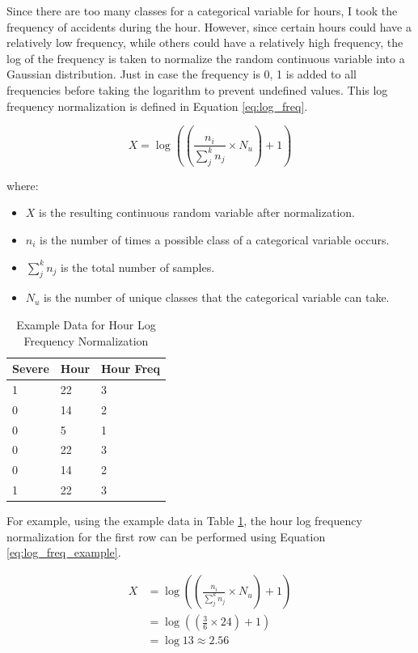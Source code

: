 Since there are too many classes for a categorical variable for hours, I took the frequency of accidents during the hour. However, since certain hours could have a relatively low frequency, while others could have a relatively high frequency, the log of the frequency is taken to normalize the random continuous variable into a Gaussian distribution. Just in case the frequency is 0, 1 is added to all frequencies before taking the logarithm to prevent undefined values. This log frequency normalization \citep{macurdypencavellog} is defined in Equation \ref{eq:log_freq}.

\begin{equation} \label{eq:log_freq}
    X = \log \left(\left({\frac{n_i}{\sum_{j}^{k}n_j}} \times N_u\right) + 1\right)
\end{equation}

\noindent
where:
\begin{itemize}
    \item $X$ is the resulting continuous random variable after normalization.
    \item $n_i$ is the number of times a possible class of a categorical variable occurs.
    \item $\sum_{j}^{k}n_j$ is the total number of samples.
    \item $N_u$ is the number of unique classes that the categorical variable can take.
\end{itemize}


\begin{table}[H] 
\centering
\begin{tabular}{lll}
Severe & Hour & Hour Freq \\ \hline
1      & 22   & 3         \\
0      & 14   & 2         \\
0      & 5    & 1         \\
0      & 22   & 3         \\
0      & 14   & 2         \\
1      & 22   & 3        
\end{tabular}
\caption{Example Data for Hour Log Frequency Normalization}
\label{table:log_freq}
\end{table}

\noindent
For example, using the example data in Table \ref{table:log_freq}, the hour log frequency normalization for the first row can be performed using Equation \ref{eq:log_freq_example}.

\begin{align} \label{eq:log_freq_example}
    X &= \log \left(\left({\frac{n_i}{\sum_{j}^{k}n_j}} \times N_u\right) + 1\right) \\
    &= \log \left(\left({\frac{3}{6}} \times 24 \right) + 1\right) \\
    &= \log 13 \approx 2.56
\end{align}

